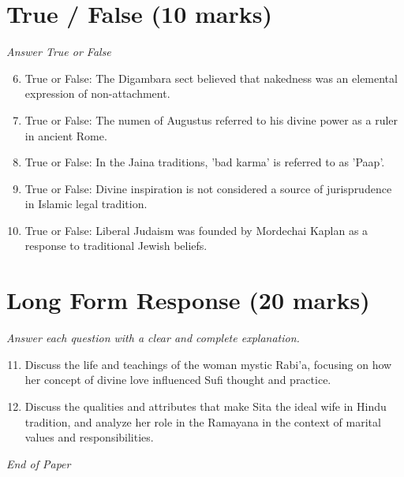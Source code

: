 \documentclass[12pt]{article}
\begin{document}
\section*{True / False (10 marks)}
\textit{Answer True or False}
\begin{enumerate}[label=\arabic*.]
\setcounter{enumi}{5}
\item True or False: The Digambara sect believed that nakedness was an elemental expression of non-attachment.
\item True or False: The numen of Augustus referred to his divine power as a ruler in ancient Rome.
\item True or False: In the Jaina traditions, 'bad karma' is referred to as 'Paap'.
\item True or False: Divine inspiration is not considered a source of jurisprudence in Islamic legal tradition.
\item True or False: Liberal Judaism was founded by Mordechai Kaplan as a response to traditional Jewish beliefs.
\end{enumerate}

\section*{Long Form Response (20 marks)}
\textit{Answer each question with a clear and complete explanation.}
\begin{enumerate}[label=\arabic*.]
\setcounter{enumi}{10}
\item Discuss the life and teachings of the woman mystic Rabi'a, focusing on how her concept of divine love influenced Sufi thought and practice.
\item Discuss the qualities and attributes that make Sita the ideal wife in Hindu tradition, and analyze her role in the Ramayana in the context of marital values and responsibilities.
\end{enumerate}

\vfill
\noindent\textit{End of Paper}
\end{document}
